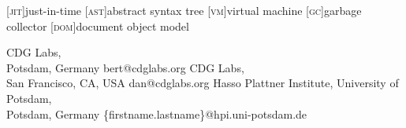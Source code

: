 [\textsc{jit}]{just-in-time}
[\textsc{ast}]{abstract syntax tree}
[\textsc{vm}]{virtual machine}
[\textsc{gc}]{garbage collector}
[\textsc{dom}]{document object model}
\newcommand\SqueakJS{Squeak\texorpdfstring{\kern.04em}{}JS\xspace}

\subtitle{The Story of \SqueakJS, a Smalltalk-80 Implementation in the Browser}

           {CDG Labs,\\ Potsdam, Germany}
           {bert@cdglabs.org}
           {CDG Labs,\\ San Francisco, CA, USA}
           {dan@cdglabs.org}
           {Hasso Plattner Institute, University of Potsdam,\\ Potsdam, Germany}
           {\{firstname.lastname\}@hpi.uni-potsdam.de}
\let\AuthorName\relax
\let\author\relax